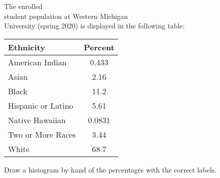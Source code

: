 \documentclass[11pt]{book}\usepackage[]{graphicx}\usepackage[]{color}
\begin{document}
\begin{exercises}
\begin{exercise}
The enrolled \\ student population  at Western  Michigan  \\ University (spring 2020) is displayed in the  following table:

{\footnotesize{
  \begin{table}[htbp]
   \centering
  \begin{tabular}{@{} lc @{}} \hline %
    Ethnicity & Percent \\ \hline
    American Indian  & 0.433  \\
    Asian & 2.16 \\
    Black  & 11.2 \\
    Hispanic or Latino & 5.61 \\
    Native Hawaiian & 0.0831 \\
    Two or More Races & 3.44 \\
    White & 68.7 \\ \hline
   \end{tabular}
   \end{table}
}}

Draw a histogram by hand of the percentages with the correct labels.

\end{exercise}







\end{exercises}
\end{document}
